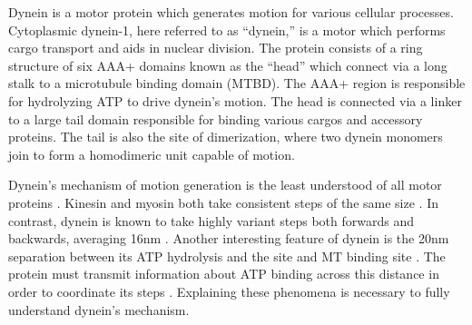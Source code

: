 \documentclass[9pt,twocolumn,twoside]{article}
\begin{document}



Dynein is a motor protein which generates motion for various cellular processes. Cytoplasmic dynein-1, here referred to as ``dynein,'' is a motor which performs cargo transport and aids in nuclear division. The protein consists of a ring structure of six AAA+ domains known as the ``head'' which connect via a long stalk to a microtubule binding domain (MTBD). The AAA+ region is responsible for hydrolyzing ATP to drive dynein's motion. The head is connected via a linker to a large tail domain responsible for binding various cargos and accessory proteins. The tail is also the site of dimerization, where two dynein monomers join to form a homodimeric unit capable of motion.

Dynein's mechanism of motion generation is the least understood of all motor proteins \cite{}. Kinesin and myosin both take consistent steps of the same size \cite{kinesin-step-size, myosin-step-size, is-this-true-in-general-i-thought-only-types-of-myosin}. In contrast, dynein is known to take highly variant steps both forwards and backwards, averaging 16nm \cite{yildizpaper, weihongpaper}. Another interesting feature of dynein is the 20nm separation between its ATP hydrolysis and the site and MT binding site \cite{3vkh-cite}. The protein must transmit information about ATP binding across this distance in order to coordinate its steps \cite{mt-atp-coupling}. Explaining these phenomena is necessary to fully understand dynein's mechanism.
\end{document}
